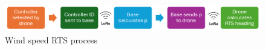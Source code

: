\begin{figure}[htbp]
  \centering
  \includegraphics[width=\textwidth]{figs/Thomas/Return To Safety/wind_process.png}
  \caption{Wind speed RTS process}
  \label{fig:wind_process}
\end{figure}
